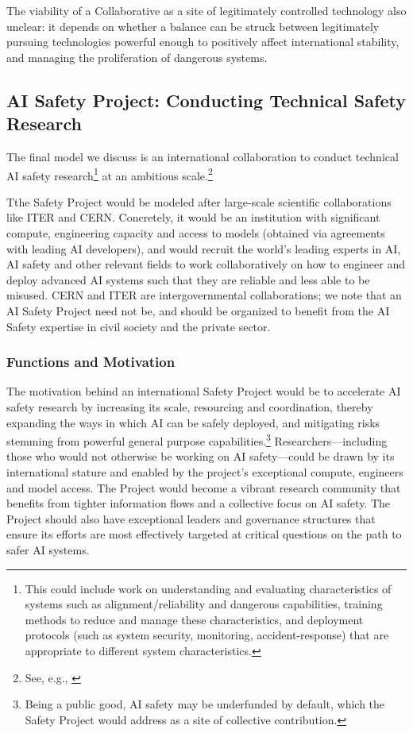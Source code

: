 \documentclass[12pt]{article}
\begin{document}
The viability of a Collaborative as a site of legitimately controlled
technology also unclear: it depends on whether a balance can be struck
between legitimately pursuing technologies powerful enough to positively
affect international stability, and managing the proliferation of
dangerous systems.


\subsection{AI Safety Project: Conducting Technical Safety
Research}

The final model we discuss is an international collaboration to conduct technical AI
safety research\footnote{This could include work on
understanding and evaluating characteristics of systems such as
alignment/reliability and dangerous capabilities, training methods to
reduce and manage these characteristics, and deployment protocols
(such as system security, monitoring, accident-response) that are
appropriate to different system characteristics.} at an ambitious
scale.\footnote{See, e.g., \cite{dubner_satya_nodate, hammond_opinion_2023}}

Tthe Safety Project would be modeled after
large-scale scientific collaborations like ITER and CERN. Concretely, it
would be an institution with significant compute, engineering capacity
and access to models (obtained via agreements with leading AI
developers), and would recruit the world's leading experts in AI, AI
safety and other relevant fields to work collaboratively on how to
engineer and deploy advanced AI systems such that they are reliable and
less able to be misused. CERN and ITER are intergovernmental
collaborations; we note that an AI Safety Project need not be, and should be
organized to benefit from the AI Safety expertise in civil society and 
the private sector.


\subsubsection*{Functions and
Motivation}

The motivation behind an international Safety Project would be to
accelerate AI safety research by increasing its scale, resourcing and
coordination, thereby expanding the ways in which AI can be safely
deployed, and mitigating risks stemming from powerful general purpose
capabilities.\footnote{Being a public good, AI safety may be underfunded
by default, which the Safety Project would address as a site of
collective contribution.} Researchers---including those who would not
otherwise be working on AI safety---could be drawn by its international
stature and enabled by the project's exceptional compute, engineers and
model access. The Project would become a vibrant research community that
benefits from tighter information flows and a collective focus on AI
safety. The Project should also have exceptional leaders and governance
structures that ensure its efforts are most effectively targeted at
critical questions on the path to safer AI systems.
\end{document}
